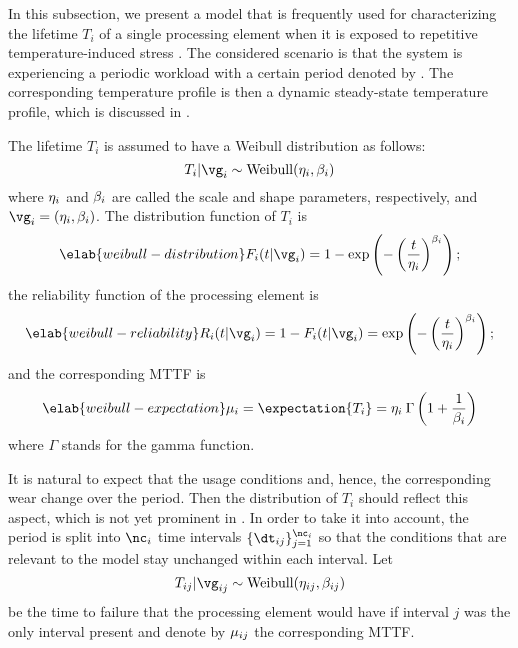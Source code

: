 In this subsection, we present a model that is frequently used for
characterizing the lifetime $T_i$ of a single processing element when it is
exposed to repetitive temperature-induced stress \cite{huang2009b, xiang2010}.
The considered scenario is that the system is experiencing a periodic workload
with a certain period denoted by \period. The corresponding temperature profile
is then a dynamic steady-state temperature profile, which is discussed in
.

The lifetime $T_i$ is assumed to have a Weibull distribution as follows:
\[
  T_i | \vg_i \sim \mathrm{Weibull}(\scale_i, \shape_i)
\]
where $\eta_i$ and $\beta_i$ are called the scale and shape parameters,
respectively, and $\vg_i = (\scale_i, \shape_i)$. The distribution function of
$T_i$ is
\begin{equation} \elab{weibull-distribution}
  F_i(t | \vg_i) = 1 - \exp\left(-\left(\frac{t}{\scale_i}\right)^{\shape_i}\right);
\end{equation}
the reliability function of the processing element is
\begin{equation} \elab{weibull-reliability}
  R_i(t | \vg_i) = 1 - F_i(t | \vg_i) = \exp\left(-\left(\frac{t}{\scale_i}\right)^{\shape_i}\right);
\end{equation}
and the corresponding \ac{MTTF} is
\begin{equation} \elab{weibull-expectation}
  \mean_i = \expectation{T_i} = \scale_i \: \Gamma\left(1 + \frac{1}{\shape_i}\right)
\end{equation}
where $\Gamma$ stands for the gamma function.

It is natural to expect that the usage conditions and, hence, the corresponding
wear change over the period. Then the distribution of $T_i$ should reflect this
aspect, which is not yet prominent in . In order to
take it into account, the period is split into $\nc_i$ time intervals $\{
\dt_{ij} \}_{j = 1}^{\nc_i}$ so that the conditions that are relevant to the
model stay unchanged within each interval. Let
\[
  T_{ij} | \vg_{ij} \sim \mathrm{Weibull}(\scale_{ij}, \shape_{ij})
\]
be the time to failure that the processing element would have if interval $j$
was the only interval present and denote by $\mu_{ij}$ the corresponding
\ac{MTTF}.

